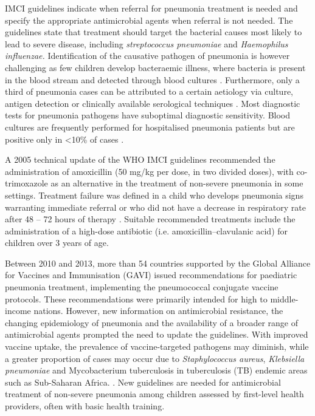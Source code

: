  IMCI guidelines indicate when referral for pneumonia treatment is needed and specify the appropriate antimicrobial agents when referral is not needed. The guidelines state that treatment should target the bacterial causes most likely to lead to severe disease, including \textit{streptococcus pneumoniae }and \textit{Haemophilus influenzae.} Identification of the causative pathogen of pneumonia is however challenging as few children develop bacteraemic illness, where bacteria is present in the blood stream and detected through blood cultures \cite{zar2013pneumonia}. Furthermore, only a third of pneumonia cases can be attributed to a certain aetiology via culture, antigen detection or clinically available serological techniques \cite{mccracken2000diagnosis}. Most diagnostic tests for pneumonia pathogens have suboptimal diagnostic sensitivity. Blood cultures are frequently performed for hospitalised pneumonia patients but are positive only in <10\% of cases \cite{murdoch2009breathing}.
 
A 2005 technical update of the WHO IMCI guidelines recommended the administration of amoxicillin (50 mg/kg per dose, in two divided doses), with co-trimoxazole as an alternative in the treatment of non-severe pneumonia in some settings. Treatment failure was defined in a child who develops pneumonia signs warranting immediate referral or who did not have a decrease in respiratory rate after 48 – 72 hours of therapy \cite{GRANT2009185}. Suitable recommended treatments include the administration of a high-dose antibiotic (i.e. amoxicillin–clavulanic acid) for children over 3 years of age. 

Between 2010 and 2013, more than 54 countries supported by the Global Alliance for Vaccines and Immunisation (GAVI) issued recommendations for paediatric pneumonia treatment, implementing the pneumococcal conjugate vaccine protocols\cite{russell2019impact}. These recommendations were primarily intended for high to middle-income nations. However, new information on antimicrobial resistance, the changing epidemiology of pneumonia and the availability of a broader range of antimicrobial agents prompted the need to update the guidelines. With improved vaccine uptake, the prevalence of vaccine-targeted pathogens may diminish, while a greater proportion of cases may occur due to \textit{Staphylococcus aureus}, \textit{Klebsiella pneumoniae} and Mycobacterium tuberculosis in tuberculosis (TB) endemic areas such as Sub-Saharan Africa. \cite{zar2013pneumonia}. New guidelines are needed for antimicrobial treatment of non-severe pneumonia among children assessed by first-level health providers, often with basic health training.


